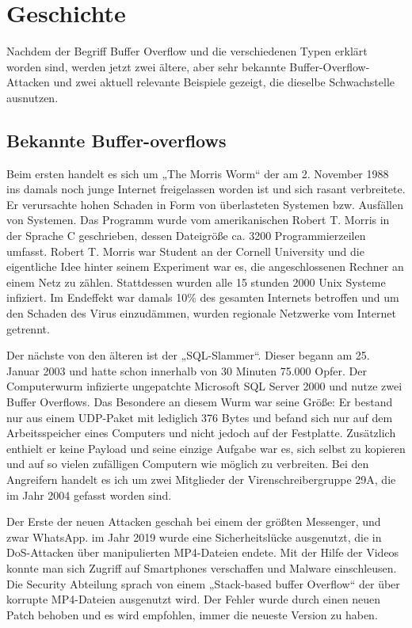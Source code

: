 \section{Geschichte}
Nachdem der Begriff Buffer Overflow und die verschiedenen Typen erklärt worden sind,
werden jetzt zwei ältere, aber sehr bekannte Buffer-Overflow-Attacken und zwei aktuell relevante Beispiele gezeigt,
die dieselbe Schwachstelle ausnutzen.

\subsection{Bekannte Buffer-overflows}

Beim ersten handelt es sich um „The Morris Worm“ der am 2. November 1988 ins damals noch junge Internet freigelassen
worden ist und sich rasant verbreitete. Er verursachte hohen Schaden in Form von überlasteten Systemen bzw. Ausfällen
von Systemen. Das Programm wurde vom amerikanischen Robert T. Morris in der Sprache C geschrieben, dessen Dateigröße
ca. 3200 Programmierzeilen umfasst. Robert T. Morris war Student an der Cornell University und die eigentliche
Idee hinter seinem Experiment war es, die angeschlossenen Rechner an einem Netz zu zählen. Stattdessen wurden alle
15 stunden 2000 Unix Systeme infiziert. Im Endeffekt war damals 10\% des gesamten Internets betroffen und um den
Schaden des Virus einzudämmen, wurden regionale Netzwerke vom Internet getrennt.

Der nächste von den älteren ist der „SQL-Slammer“. Dieser begann am 25. Januar 2003 und hatte schon innerhalb
von 30 Minuten 75.000 Opfer. Der Computerwurm infizierte ungepatchte Microsoft SQL Server 2000 und nutze zwei
Buffer Overflows. Das Besondere an diesem Wurm war seine Größe: Er bestand nur aus einem UDP-Paket mit lediglich
376 Bytes und befand sich nur auf dem Arbeitsspeicher eines Computers und nicht jedoch auf der Festplatte.
Zusätzlich enthielt er keine Payload und seine einzige Aufgabe war es, sich selbst zu kopieren und auf so
vielen zufälligen Computern wie möglich zu verbreiten. Bei den Angreifern handelt es ich um zwei Mitglieder
der Virenschreibergruppe 29A, die im Jahr 2004 gefasst worden sind.

Der Erste der neuen Attacken geschah bei einem der größten Messenger, und zwar WhatsApp. im Jahr
2019 wurde eine Sicherheitslücke ausgenutzt, die in DoS-Attacken über manipulierten MP4-Dateien endete.
Mit der Hilfe der Videos konnte man sich Zugriff auf Smartphones verschaffen und Malware einschleusen.
Die Security Abteilung sprach von einem „Stack-based buffer Overflow“ der über korrupte MP4-Dateien ausgenutzt wird.
Der Fehler wurde durch einen neuen Patch behoben und es wird empfohlen, immer die neueste Version zu haben.

